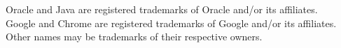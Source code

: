 \documentclass{beamer}
\begin{document}
\begin{frame}
	
	\tiny
	Oracle and Java are registered trademarks of Oracle and/or its affiliates. \\
	Google and Chrome are registered trademarks of Google and/or its affiliates. \\
	Other names may be trademarks of their respective owners.

\end{frame}
\end{document}
